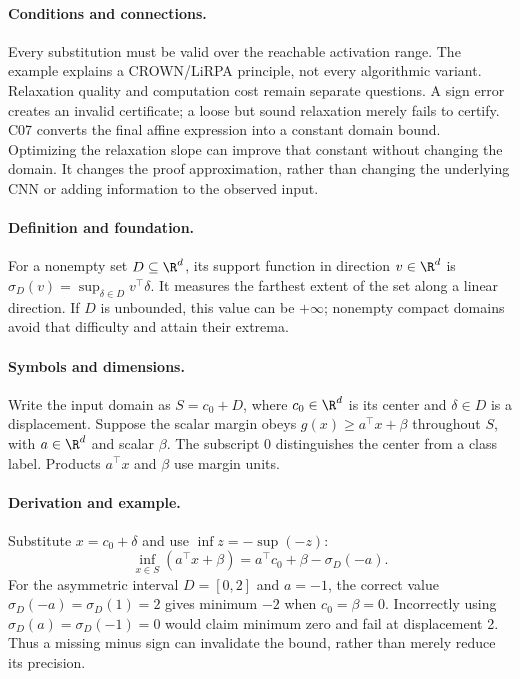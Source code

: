 \paragraph{Conditions and connections.}
Every substitution must be valid over the reachable activation range. The example explains a CROWN/LiRPA principle, not every algorithmic variant. Relaxation quality and computation cost remain separate questions. A sign error creates an invalid certificate; a loose but sound relaxation merely fails to certify. C07 converts the final affine expression into a constant domain bound. Optimizing the relaxation slope can improve that constant without changing the domain. It changes the proof approximation, rather than changing the underlying CNN or adding information to the observed input.

\paragraph{Definition and foundation.}
For a nonempty set $D\subseteq\R^d$, its support function in direction $v\in\R^d$ is $\sigma_D(v)=\sup_{\delta\in D}v^\top\delta$. It measures the farthest extent of the set along a linear direction. If $D$ is unbounded, this value can be $+\infty$; nonempty compact domains avoid that difficulty and attain their extrema.
\paragraph{Symbols and dimensions.}
Write the input domain as $S=c_0+D$, where $c_0\in\R^d$ is its center and $\delta\in D$ is a displacement. Suppose the scalar margin obeys $g(x)\ge a^\top x+\beta$ throughout $S$, with $a\in\R^d$ and scalar $\beta$. The subscript 0 distinguishes the center from a class label. Products $a^\top x$ and $\beta$ use margin units.
\paragraph{Derivation and example.}
Substitute $x=c_0+\delta$ and use $\inf z=-\sup(-z)$:
\[
 \inf_{x\in S}(a^\top x+\beta)
 =a^\top c_0+\beta-\sigma_D(-a).
\]
For the asymmetric interval $D=[0,2]$ and $a=-1$, the correct value $\sigma_D(-a)=\sigma_D(1)=2$ gives minimum $-2$ when $c_0=\beta=0$. Incorrectly using $\sigma_D(a)=\sigma_D(-1)=0$ would claim minimum zero and fail at displacement 2. Thus a missing minus sign can invalidate the bound, rather than merely reduce its precision.
